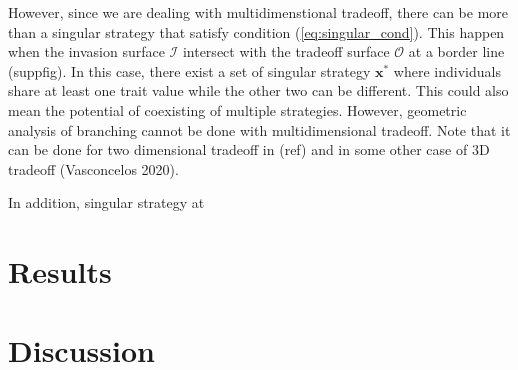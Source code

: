 \documentclass[11pt]{article}
\begin{document}
However, since we are dealing with multidimenstional tradeoff, there can be more than a singular strategy that satisfy condition (\ref{eq:singular_cond}). This happen when the invasion surface $\mathcal{I}$ intersect with the tradeoff surface $\mathcal{O}$ at a border line (suppfig). In this case, there exist a set of singular strategy $\mathbf{x}^*$ where individuals share at least one trait value while the other two can be different. This could also mean the potential of coexisting of multiple strategies. However, geometric analysis of branching cannot be done with multidimensional tradeoff. Note that it can be done for two dimensional tradeoff in (ref) and in some other case of 3D tradeoff (Vasconcelos 2020).

In addition, singular strategy at
\section*{Results}

%
%
%
%

\section*{Discussion}
\end{document}

